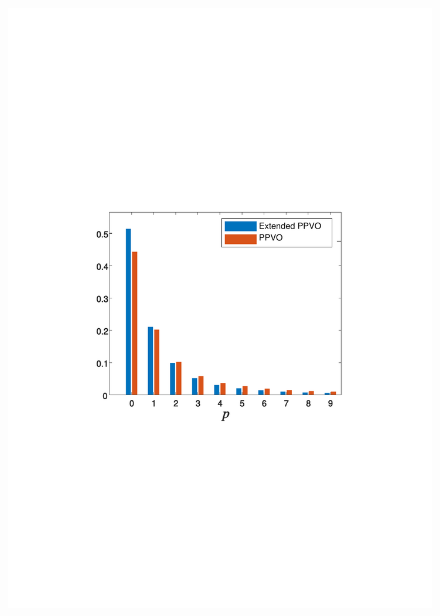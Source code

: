 \documentclass[review,3p,10pt,sort&compress]{elsarticle}
\begin{document}
\begin{figure}
{\begin{minipage}[t]{0.223\linewidth}
    \includegraphics[width=1\textwidth]{figures/Comparison/airplane.pdf}
    \end{minipage}
}
\end{figure}
\end{document}
